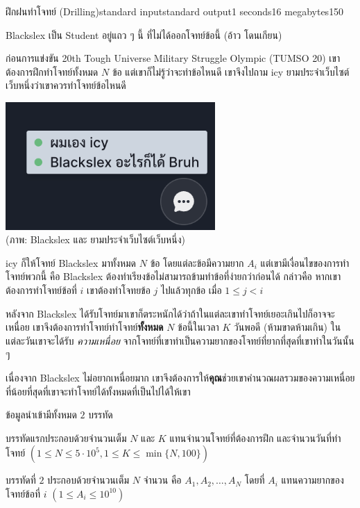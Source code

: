 \documentclass[11pt,a4paper]{article}
\begin{document}
\begin{problem}{ฝึกฝนทำโจทย์ (Drilling)}{standard input}{standard output}{1 seconds}{16 megabytes}{150}

Blackslex เป็น Student อยู่แถว ๆ นี้ ที่ไม่ได้ออกโจทย์ข้อนี้ (อ้าว โดนเกียน)

ก่อนการแข่งขัน 20th Tough Universe Military Struggle Olympic (TUMSO 20) เขาต้องการฝึกทำโจทย์ทั้งหมด $N$ ข้อ แต่เขาก็ไม่รู้ว่าจะทำข้อไหนดี เขาจึงไปถาม icy ยามประจำเว็บไซต์เว็บหนึ่งว่าเขาควรทำโจทย์ข้อไหนดี

\begin{center}
    \includegraphics[width=8cm]{drilling/image.png} \\
    (ภาพ: Blackslex และ ยามประจำเว็บไซต์เว็บหนึ่ง)
\end{center}

icy ก็ให้โจทย์ Blackslex มาทั้งหมด $N$ ข้อ โดยแต่ละข้อมีความยาก $A_{i}$ แต่เขามีเงื่อนไขของการทำโจทย์พวกนี้ คือ Blackslex ต้องทำเรียงข้อไม่สามารถข้ามทำข้อที่ง่ายกว่าก่อนได้ กล่าวคือ หากเขาต้องการทำโจทย์ข้อที่ $i$ เขาต้องทำโจทยข้อ $j$ ไปแล้วทุกข้อ เมื่อ $1\leq j<i$ 

หลังจาก Blackslex ได้รับโจทย์มาเขาก็ตระหนักได้ว่าถ้าในแต่ละเขาทำโจทย์เยอะเกินไปก็อาจจะเหนื่อย เขาจึงต้องการทำโจทย์ทำโจทย์\textbf{ทั้งหมด} $N$ ข้อนี้ในเวลา $K$ วันพอดี (ห้ามขาดห้ามเกิน) ในแต่ละวันเขาจะได้รับ \textit{ความเหนื่อย} จากโจทย์ที่เขาทำเป็นความยากของโจทย์ที่ยากที่สุดที่เขาทำในวันนั้น ๆ

เนื่องจาก Blackslex ไม่อยากเหนื่อยมาก เขาจึงต้องการให้\textbf{คุณ}ช่วยเขาคำนวณผลรวมของความเหนื่อยที่น้อยที่สุดที่เขาจะทำโจทย์ได้ทั้งหมดที่เป็นไปได้ให้เขา

\InputFile
ข้อมูลนำเข้ามีทั้งหมด $2$ บรรทัด

บรรทัดแรกประกอบด้วยจำนวนเต็ม $N$ และ $K$ แทนจำนวนโจทย์ที่ต้องการฝึก และจำนวนวันที่ทำโจทย์ $(1\leq N\leq 5\cdot 10^{5},1\leq K\leq \min\{N,100\})$

บรรทัดที่ $2$ ประกอบด้วยจำนวนเต็ม $N$ จำนวน คือ $A_1,A_2,\ldots,A_N$ โดยที่ $A_i$ แทนความยากของโจทย์ข้อที่ $i$ $(1\leq A_i\leq 10^{10})$


\end{problem}
\end{document}

